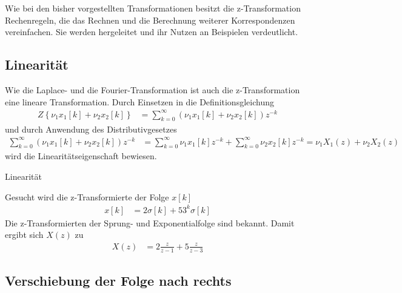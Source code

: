 Wie bei den bisher vorgestellten Transformationen besitzt die z-Transformation Rechenregeln, die das Rechnen und die Berechnung weiterer Korrespondenzen vereinfachen. Sie werden hergeleitet und ihr Nutzen an Beispielen verdeutlicht.

\subsection{Linearität}\label{sec:linearituxe4t-2}

Wie die Laplace- und die Fourier-Transformation ist auch die z-Transformation eine lineare Transformation. Durch Einsetzen in die Definitionsgleichung
\begin{align}
Z\left\{ \nu_{1}  x_{1}[ k] + \nu_{2}  x_{2}[ k] \right\} &= \sum\limits_{k = 0}^{\infty}{\left( \nu_{1}  x_{1}[ k] + \nu_{2}  x_{2}[ k] \right)  z^{- k}} \label{eq:5.37}
\end{align}
und durch Anwendung des Distributivgesetzes
\begin{align}
\sum\limits_{k = 0}^{\infty}{\left( \nu_{1}  x_{1}[ k] + \nu_{2}  x_{2}[ k] \right)  z^{- k}} &= \sum\limits_{k = 0}^{\infty}{\nu_{1}  x_{1}[ k]  z^{- k}} + \sum\limits_{k = 0}^{\infty}{\nu_{2}  x_{2}[ k]  z^{- k}} = \nu_{1}  X_{1}(z) + \nu_{2}  X_{2}(z) \label{eq:5.38}
\end{align}
wird die Linearitätseigenschaft bewiesen.

\begin{example}{Linearität}
\label{example:beispiel-linearituxe4t}

Gesucht wird die z-Transformierte der Folge \(x[k]\)
\begin{align*}
x[ k] &= 2  \sigma[ k] + 5  3^{k}  \sigma[ k] 
\end{align*}
Die z-Transformierten der Sprung- und Exponentialfolge sind bekannt. Damit ergibt sich \(X(z)\) zu
\begin{align*}
X(z) &= 2  \frac{z}{z - 1} + 5  \frac{z}{z - 3} 
\end{align*}
\end{example}

\subsection{Verschiebung der Folge nach rechts}\label{sec:verschiebung-der-folge-nach-rechts}

